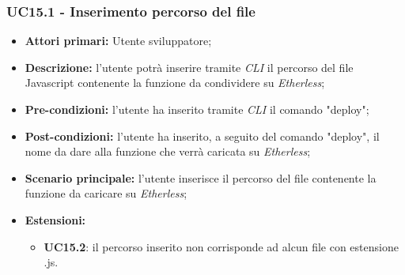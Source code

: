 \subsubsection{UC15.1 - Inserimento percorso del file}
\begin{itemize}
	\item \textbf{Attori primari:} Utente sviluppatore;
	\item \textbf{Descrizione:} l'utente potrà inserire tramite \textit{CLI} il percorso del file Javascript contenente la funzione da condividere su \textit{Etherless}; 
	\item \textbf{Pre-condizioni:} l'utente ha inserito tramite \textit{CLI\glo} il comando "deploy";
	\item \textbf{Post-condizioni:} l'utente ha inserito, a seguito del comando "deploy", il nome da dare alla funzione che verrà caricata su \textit{Etherless};
	\item \textbf{Scenario principale:} l'utente inserisce il percorso del file contenente la funzione da caricare su \textit{Etherless};
	\item \textbf{Estensioni:} 
	\begin{itemize}
		\item \textbf{UC15.2}: il percorso inserito non corrisponde ad alcun file con estensione .js.
	\end{itemize}
\end{itemize}